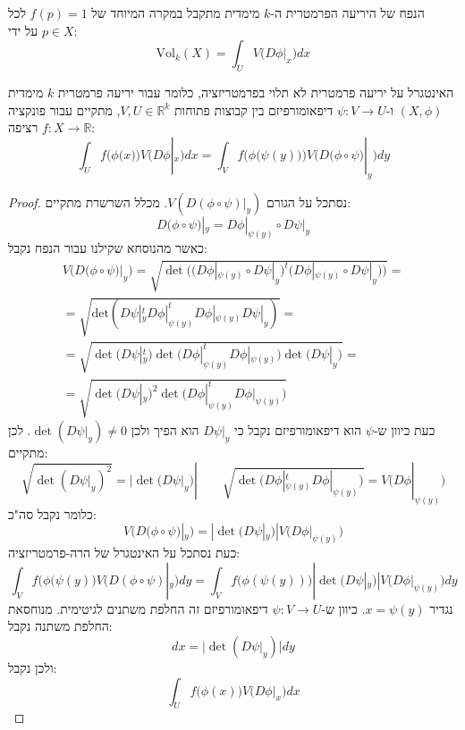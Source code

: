 \documentclass{tstextbook}
\begin{document}
\begin{remark}
הנפח של היריעה הפרמטרית ה-\(k\) מימדית מתקבל במקרה המיוחד של \(f(p)=1\) לכל \(p \in X\) על ידי:
$$\text{Vol}_{k}(X)=\int_{U}V{\big(}D\phi|_{x}{\big)}d x$$

\end{remark}
\begin{lemma}
האינטגרל על יריעה פרמטרית לא תלוי בפרמטריזציה, כלומר עבור יריעה פרמטרית \(k\) מימדית \((X,\phi)\) ו-\(\psi:V\to U\) דיפאומורפיזם בין קבוצות פתוחות \(V,U \in \mathbb{R}^{k}\), מתקיים עבור פונקציה רציפה \(f:X\to \mathbb{R}\):
$$\int_{U}f{\big(}\phi{\big(}x{\big)}{\big)}V{\big(}D\phi|_{x}{\big)}d x=\int_{V}f{\big(}\phi{\big(}\psi(y){\big)}{\big)}V{\big(}D{\big(}\phi\circ\psi)|_{y}{\big)}d y$$

\end{lemma}
\begin{proof}
נסתכל על הגורם \(V(D(\phi \circ\psi)|_{y})\). מכלל השרשרת מתקיים:
$$D\big(\phi\circ\psi\big)|_{y}=D\phi|_{\psi(y)}\circ D\psi|_{y}$$
כאשר מהנוסחא שקילנו עבור הנפח נקבל:
\begin{gather*}V\bigl(D\bigl(\phi\circ\psi\bigr)|_{y}\bigr)=\sqrt{\operatorname*{det}\bigl((D\phi|_{\psi(y)}\circ D\psi|_{y}\bigr)^{t}\bigl(D\phi|_{\psi(y)}\circ D\psi|_{y}\bigr)\bigr)}= \\=\sqrt{\mathrm{det}(D\psi|_{y}^{t}D\phi|_{\psi(y)}^{t}D\phi|_{\psi(y)}D\psi|_{y})}= \\=\sqrt{\operatorname*{det}(D\psi|_{y}^{t})\operatorname*{det}\bigl(D\phi|_{\psi(y)}^{t}D\phi|_{\psi(y)}\bigr)\operatorname*{det}\bigl(D\psi|_{y}\bigr)}= \\=\sqrt{\operatorname*{det}(D\psi|_{y})^{2}\operatorname*{det}\bigl(D\phi|_{\psi(y)}^{t}D\phi|_{\psi(y)}\bigr)}
\end{gather*}
כעת כיוון ש-\(\psi\) הוא דיפאומורפיזם נקבל כי \(D\psi|_{y}\) הוא הפיך ולכן \(\det(D\psi|_{y})\neq 0\). לכן מתקיים:
$$\sqrt{\operatorname*{det}(D\psi|_{y})^{2}}=|\operatorname*{det}\bigl(D\psi|_{y}\bigr)|\qquad \sqrt{\operatorname*{det}\bigl(D\phi|_{\psi(y)}^{t}D\phi|_{\psi(y)}\bigr)}=V\bigl(D\phi|_{\psi(y)}\bigr)$$
כלומר נקבל סה"כ:
$${ V}\bigl({ D}\bigl(\phi\circ\psi\bigr)|_{y}\bigr)=|\operatorname*{det}\bigl({ D}\psi|_{y}\bigr)|{ V}\bigl({ D}\phi|_{\psi(y)}\bigr)$$
כעת נסתכל על האינטגרל של הרה-פרמטריזציה:
$$\int_{V}f{\big(}\phi(\psi(y){\big)}V{\big(}D(\phi\circ\psi)|_{y}{\big)}d y=\int_{V}f{\big(}\phi(\psi(y)){\big)}|\operatorname*{det}\!{\big(}D\psi|_{y}{\big)}|V{\big(}D\phi|_{\psi(y)}{\big)}d y$$
נגדיר \(x=\psi(y)\). כיוון ש-\(\psi:V\to U\) דיפאומורפיזם זה החלפת משתנים לגיטימית. מנוחסאת החלפת משתנה נקבל:
$$dx=\lvert \det(D\psi|_{y}) \rvert dy$$
ולכן נקבל:
$$\int_{U}f{\big(}\phi(x){\big)}V{\big(}D\phi|_{x}{\big)}d x$$

\end{proof}
\end{document}
